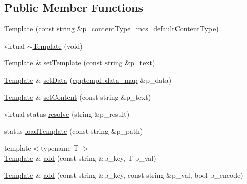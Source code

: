 \subsection*{Public Member Functions}
\begin{DoxyCompactItemize}
\item 
\hyperlink{classxtd_1_1network_1_1http_1_1Template_a1887dcae44d24a8594bc41a349a7e6fe}{Template} (const string \&p\-\_\-content\-Type=\hyperlink{classxtd_1_1network_1_1http_1_1Generator_aef564fc3152e7477bb429e45b19328fc}{mcs\-\_\-default\-Content\-Type})
\item 
virtual \hyperlink{classxtd_1_1network_1_1http_1_1Template_aa31bb4b8ade7e47fb564004bbf92c542}{$\sim$\-Template} (void)
\item 
\hyperlink{classxtd_1_1network_1_1http_1_1Template}{Template} \& \hyperlink{classxtd_1_1network_1_1http_1_1Template_a9f7dca8396a9e5092b1e293076a7ec86}{set\-Template} (const string \&p\-\_\-text)
\item 
\hyperlink{classxtd_1_1network_1_1http_1_1Template}{Template} \& \hyperlink{classxtd_1_1network_1_1http_1_1Template_ad6ba5fa3f5e0a2256cc356d1c6fd21f8}{set\-Data} (\hyperlink{namespacextd_1_1network_1_1http_1_1cpptempl_a638d1d81c8fb63c0bbafd508d6a2a007}{cpptempl\-::data\-\_\-map} \&p\-\_\-data)
\item 
\hyperlink{classxtd_1_1network_1_1http_1_1Template}{Template} \& \hyperlink{classxtd_1_1network_1_1http_1_1Template_a0c28c6cc5e8cc71bcb026ff73551c4be}{set\-Content} (const string \&p\-\_\-text)
\item 
virtual status \hyperlink{classxtd_1_1network_1_1http_1_1Template_a476ce5e5b8465ea80ade07c003ab5cfd}{resolve} (string \&p\-\_\-result)
\item 
status \hyperlink{classxtd_1_1network_1_1http_1_1Template_a1250db96f0300bf4f56aae5929e5dbb2}{load\-Template} (const string \&p\-\_\-path)
\item 
{\footnotesize template$<$typename T $>$ }\\\hyperlink{classxtd_1_1network_1_1http_1_1Template}{Template} \& \hyperlink{classxtd_1_1network_1_1http_1_1Template_aade6209a71f79db50f37ac18c0afd5a1}{add} (const string \&p\-\_\-key, T p\-\_\-val)
\item 
\hyperlink{classxtd_1_1network_1_1http_1_1Template}{Template} \& \hyperlink{classxtd_1_1network_1_1http_1_1Template_a543a79fedf08f519912e9ad42a3d3f64}{add} (const string \&p\-\_\-key, const string \&p\-\_\-val, bool p\-\_\-encode)
\end{DoxyCompactItemize}
